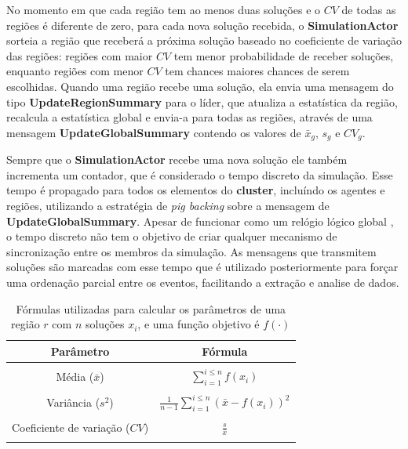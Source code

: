 No momento em que cada região tem ao menos duas soluções e o $CV$ de todas as regiões é diferente de zero, para cada nova solução recebida, o \textbf{SimulationActor} sorteia a região que receberá a próxima solução baseado no coeficiente de variação das regiões: regiões com maior $CV$ tem menor probabilidade de receber soluções, enquanto regiões com menor $CV$ tem chances maiores chances de serem escolhidas. Quando uma região recebe uma solução, ela envia uma mensagem do tipo \textbf{UpdateRegionSummary} para o líder, que atualiza a estatística da região, recalcula a estatística global e envia-a para todas as regiões, através de uma mensagem \textbf{UpdateGlobalSummary} contendo os valores de $\bar{x}_g$, $s_g$ e $CV_g$. 

Sempre que o \textbf{SimulationActor} recebe uma nova solução ele também incrementa um contador, que é considerado o tempo discreto da simulação. Esse tempo é propagado para todos os elementos do \textbf{cluster}, incluíndo os agentes e regiões, utilizando a estratégia de \textit{pig backing} sobre a mensagem de \textbf{UpdateGlobalSummary}. Apesar de funcionar como um relógio lógico global  \cite[p. 244]{tanenbaum}, o tempo discreto não tem o objetivo de criar qualquer mecanismo de sincronização entre os membros da simulação. As mensagens que transmitem soluções são marcadas com esse tempo que é utilizado posteriormente para forçar uma ordenação parcial entre os eventos, facilitando a extração e analise de dados. 

\begin{table}[]
    \centering
    \renewcommand{\arraystretch}{1.5} %
    \caption{Fórmulas utilizadas para calcular os parâmetros de uma região $r$ com $n$ soluções $x_i$, e uma função objetivo é $f(\cdot)$ }
    \label{tab:formulas}
    \begin{tabular}{cc}
        \toprule
         \textbf{Parâmetro} & \textbf{Fórmula} \\
         \midrule
         \\
         Média ($\bar{x}$) & \( \displaystyle \sum_{i = 1}^{i \leq n} f(x_i) \) \\ \\
         Variância ($s^2$) & \( \displaystyle \frac{1}{n - 1} \sum_{i = 1}^{i \leq n} (\bar{x} - f(x_i))^2 \) \\ \\
         Coeficiente de variação ($CV$) & \( \displaystyle \frac{s}{\bar{x}} \) \\ \\
         \bottomrule
    \end{tabular}
\end{table}

